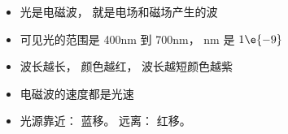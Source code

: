 
\begin{issues}
\issueDraft
\end{issues}

\begin{itemize}
\item 光是电磁波， 就是电场和磁场产生的波
\item 可见光的范围是 400nm 到 700nm， nm 是 $1\e{-9}$
\item 波长越长， 颜色越红， 波长越短颜色越紫
\item 电磁波的速度都是光速
\item 光源靠近： 蓝移。 远离： 红移。
\end{itemize}

